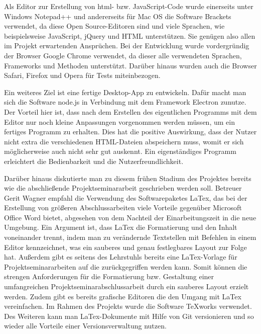 Als Editor zur Erstellung von html- bzw. JavaScript-Code wurde einerseits unter Windows Notepad++ und andererseits für Mac OS die Software Brackets verwendet, da diese Open Source-Editoren sind und viele Sprachen, wie beispielsweise JavaScript, jQuery und HTML unterstützen. Sie genügen also allen im Projekt erwartenden Ansprüchen.
Bei der Entwicklung wurde vordergründig der Browser Google Chrome verwendet, da dieser alle verwendeten Sprachen, Frameworks und Methoden unterstützt. Darüber hinaus wurden auch die Browser Safari, Firefox und Opera für Tests miteinbezogen.

Ein weiteres Ziel ist eine fertige Desktop-App zu entwickeln. Dafür macht man sich die Software node.js in Verbindung mit dem Framework Electron zunutze. Der Vorteil hier ist, dass nach dem Erstellen des eigentlichen Programms mit dem Editor nur noch kleine Anpassungen vorgenommen werden müssen, um ein fertiges Programm zu erhalten. Dies hat die positive Auswirkung, dass der Nutzer nicht extra die verschiedenen HTML-Dateien abspeichern muss, womit er sich möglicherweise auch nicht sehr gut auskennt. Ein eigenständiges Programm erleichtert die Bedienbarkeit und die Nutzerfreundlichkeit. 

Darüber hinaus diskutierte man zu diesem frühen Stadium des Projektes bereits wie die abschließende Projektseminararbeit geschrieben werden soll. Betreuer Gerit Wagner empfahl die Verwendung des Softwarepaketes LaTex, das bei der Erstellung von größeren Abschlussarbeiten viele Vorteile gegenüber Microsoft Office Word bietet, abgesehen von dem Nachteil der Einarbeitungszeit in die neue Umgebung. Ein Argument ist, dass LaTex die Formatierung und den Inhalt voneinander trennt, indem man zu verändernde Textstellen mit Befehlen in einem Editor kennzeichnet, was ein sauberes und genau festlegbares Layout zur Folge hat.  Außerdem gibt es seitens des Lehrstuhls bereits eine LaTex-Vorlage für Projektseminararbeiten auf die zurückgegriffen werden kann. Somit können die strengen Anforderungen für die Formatierung bzw. Gestaltung einer umfangreichen Projektseminarabschlussarbeit durch ein sauberes Layout erzielt werden. Zudem gibt es bereits grafische Editoren die den Umgang mit LaTex vereinfachen. Im Rahmen des Projekts wurde die Software TeXworks verwendet. Des Weiteren kann man LaTex-Dokumente mit Hilfe von Git versionieren und so wieder alle Vorteile einer Versionsverwaltung nutzen.


